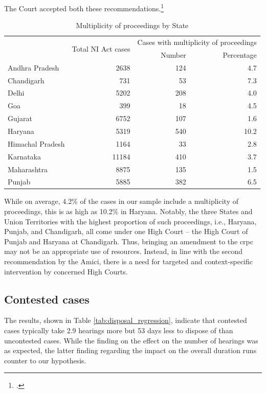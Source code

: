 \documentclass[12pt,a4paper]{article}
\begin{document}
The Court accepted both these recommendations.\footcite{sc2020_138}

\begin{longtable}{@{}lrrr@{}}
\caption{Multiplicity of proceedings by State}\label{tab:state_multiplicity}\\
\toprule
\footnotesize
\multirow{2}{*}{State} & \multirow{2}{*}{Total NI Act cases} & \multicolumn{2}{p{4cm}}{Cases with multiplicity of proceedings} \\
\cmidrule{3-4}
& & Number & Percentage \\
\midrule
\endhead
Andhra Pradesh & 2638 & 124 & 4.7 \\
Chandigarh & 731 & 53 & 7.3 \\
Delhi & 5202 & 208 & 4.0 \\
Goa & 399 & 18 & 4.5 \\
Gujarat & 6752 & 107 & 1.6 \\
Haryana & 5319 & 540 & 10.2 \\
Himachal Pradesh & 1164 & 33 & 2.8 \\
Karnataka & 11184 & 410 & 3.7 \\
Maharashtra & 8875 & 135 & 1.5 \\
Punjab & 5885 & 382 & 6.5 \\
\bottomrule
\end{longtable}

While on average, 4.2\% of the cases in our sample include a multiplicity of proceedings, this is as high as 10.2\% in Haryana. Notably, the three States and Union Territories with the highest proportion of such proceedings, i.e., Haryana, Punjab, and Chandigarh, all come under one High Court -- the High Court of Punjab and Haryana at Chandigarh. Thus, bringing an amendment to the \gls{crpc} may not be an appropriate use of resources. Instead, in line with the second recommendation by the Amici, there is a need for targeted and context-specific intervention by concerned High Courts.

\subsection{Contested cases}
\label{sec:contested-cases}

The results, shown in Table \ref{tab:disposal_regression}, indicate that contested cases typically take 2.9 hearings more but 53 days less to dispose of than uncontested cases. While the finding on the effect on the number of hearings was as expected, the latter finding regarding the impact on the overall duration runs counter to our hypothesis.
\end{document}
